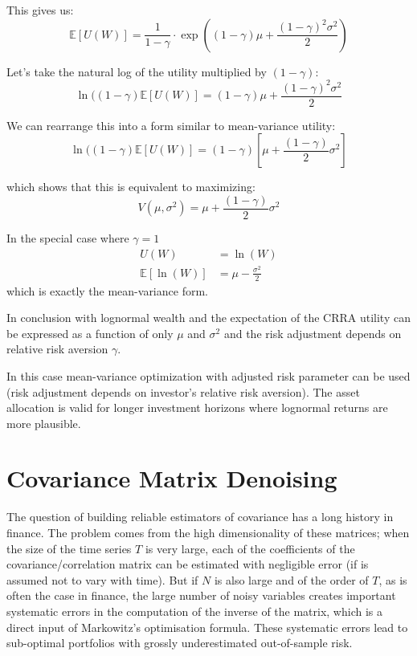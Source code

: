 This gives us:
\begin{equation*}
\mathbb{E}[U(W)] = \frac{1}{1-\gamma} \cdot \exp\left((1-\gamma)\mu + \frac{(1-\gamma)^2\sigma^2}{2}\right)
\end{equation*}

Let's take the natural log of the utility multiplied by $(1-\gamma)$:
\begin{equation*}
\ln((1-\gamma)\mathbb{E}[U(W)] = (1-\gamma)\mu + \frac{(1-\gamma)^2\sigma^2}{2}
\end{equation*}

We can rearrange this into a form similar to mean-variance utility:
\begin{equation*}
\ln((1-\gamma)\mathbb{E}[U(W)] = (1-\gamma)\left[\mu + \frac{(1-\gamma)}{2}\sigma^2\right]
\end{equation*}

which shows that this is equivalent to maximizing:
\begin{equation*}
V(\mu, \sigma^2) = \mu + \frac{(1-\gamma)}{2}\sigma^2
\end{equation*}

In the special case where $\gamma=1$
\begin{align*}
U(W) &= \ln(W) \\
\mathbb{E}[\ln(W)] &= \mu - \frac{\sigma^2}{2}
\end{align*}
which is exactly the mean-variance form.

In conclusion with lognormal wealth and the expectation of the CRRA utility can be expressed as a function of only $\mu$ and $\sigma^2$ and the risk adjustment depends on relative risk aversion $\gamma$.

In this case mean-variance optimization with adjusted risk parameter can be used (risk adjustment depends on investor's relative risk aversion). The asset allocation is valid for longer investment horizons where lognormal returns are more plausible.

\section{Covariance Matrix Denoising}

The question of building reliable estimators of covariance has a long history in finance. The problem comes from the high dimensionality of these matrices; when the size of the time series $T$ is very large, each of the coefficients of the covariance/correlation matrix can be estimated with negligible error (if is assumed not to vary with time). But if $N$ is also large and of the order of $T$, as is often the case in finance, the large number of noisy variables creates important systematic errors in the computation of the inverse of the matrix, which is a direct input of Markowitz’s optimisation formula. These systematic errors lead to sub-optimal portfolios with grossly underestimated out-of-sample risk.

